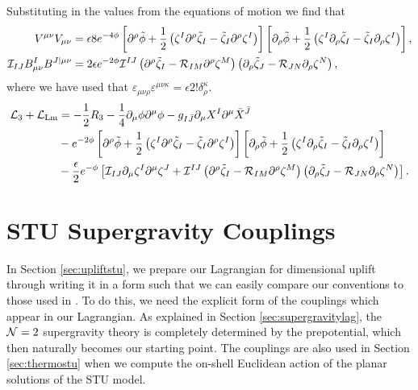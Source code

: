 Substituting in the values from the equations of motion we find that
\begin{equation*}
	\begin{aligned}
			V^{\mu \nu} V_{\mu \nu} &= \epsilon 8 e^{-4 \phi} \left[ \partial^\rho \tilde{\phi} + \frac{1}{2} \left(\zeta^I \partial^\rho \tilde{\zeta}_I - \tilde{\zeta}_I \partial^\rho \zeta^I \right) \right] \left[ \partial_\rho \tilde{\phi} + \frac{1}{2} \left(\zeta^I \partial_\rho \tilde{\zeta}_I - \tilde{\zeta}_I \partial_\rho \zeta^I \right) \right],\\
	{\cal I}_{I J} B_{\mu \nu}^I B^{J | \mu \nu} &= 2 \epsilon e^{-2 \phi} {\cal I}^{IJ} 
	\left(\partial^\rho \tilde{\zeta}_I - {\cal R}_{IM} \partial^\rho \zeta^M \right) 
	\left( \partial_\rho \tilde{\zeta}_J - {\cal R}_{JN} \partial_\rho \zeta^N \right),
	\end{aligned}
\end{equation*}
where we have used that $\varepsilon_{\mu \nu \rho} \varepsilon^{\mu \nu \kappa} = \epsilon 2! \delta^\kappa_\rho$.
\begin{equation*}
\begin{aligned}
 {\cal L}_3 + {\cal L}_{\text{Lm}} &= -\frac{1}{2} R_3 - \frac{1}{4}\partial_\mu \phi \partial^\mu \phi - g_{I\bar{J}} \partial_\mu X^I \partial^\mu \bar{X}^{\bar{J}} \\
 &- e^{-2\phi} \left[ \partial^\rho \tilde{\phi} + \frac{1}{2} \left(\zeta^I \partial^\rho \tilde{\zeta}_I - \tilde{\zeta}_I \partial^\rho \zeta^I \right) \right] \left[ \partial_\rho \tilde{\phi} + \frac{1}{2} \left(\zeta^I \partial_\rho \tilde{\zeta}_I - \tilde{\zeta}_I \partial_\rho \zeta^I \right) \right] \\
 &- \frac{\epsilon}{2} e^{-\phi} \left[{\cal I}_{IJ} \partial_\mu\zeta^I \partial^\mu \zeta^J + {\cal I}^{IJ} 
	\left(\partial^\rho \tilde{\zeta}_I - {\cal R}_{IM} \partial^\rho \zeta^M \right) 
	\left(\partial_\rho \tilde{\zeta}_J - {\cal R}_{JN} \partial_\rho \zeta^N \right) \right].
\end{aligned}
\end{equation*}

\chapter{STU Supergravity Couplings}
\label{app:stucouplings}

In Section \ref{sec:upliftstu}, we prepare our Lagrangian for dimensional uplift through writing it in a form such that we can easily compare our conventions to those used in \cite{Chow:2014cca}. To do this, we need the explicit form of the couplings which appear in our Lagrangian. As explained in Section \ref{sec:supergravitylag}, the ${\cal N} = 2$ supergravity theory is completely determined by the prepotential, which then naturally becomes our starting point. The couplings are also used in Section \ref{sec:thermostu} when we compute the on-shell Euclidean action of the planar solutions of the STU model.

